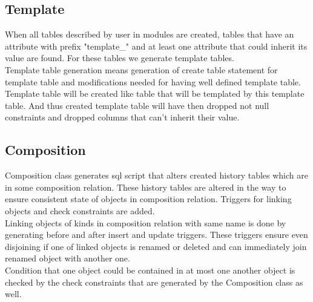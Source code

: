 \documentclass[deska]{subfiles}
\begin{document}

\subsection{Template}
When all tables described by user in modules are created, tables that have an attribute with prefix "template\_" and at least one attribute that could inherit its value are found. For these tables we generate template tables.\\
Template table generation means generation of create table statement for template table and modifications needed for having well defined template table.
Template table will be created like table that will be templated by this template table. And thus created template table will have then dropped not null constraints and dropped columns that can't inherit their value.


\subsection{Composition}
Composition class generates sql script that alters created history tables which are in some composition relation. These history tables are altered in the way to ensure consistent state of objects in composition relation. Triggers for linking objects and check constraints are added.\\
Linking objects of kinds in composition relation with same name is done by generating before and after insert and update triggers. These triggers ensure even disjoining if one of linked objects is renamed or deleted and can immediately join renamed object with another one.\\
Condition that one object could be contained in at most one another object is checked by the check constraints that are generated by the Composition class as well.
\end{document}
